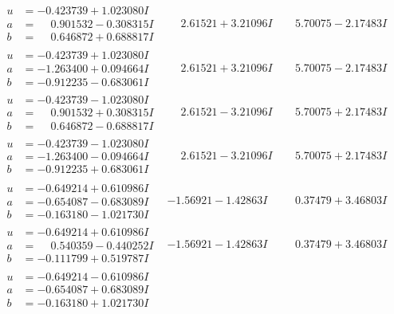 \documentclass[1p]{elsarticle_modified}
\theoremstyle{definition}
\begin{document}
$$\begin{array}{c|c|c}
\begin{aligned}
u &= -0.423739 + 1.023080 I \\
a &= \phantom{-}0.901532 - 0.308315 I \\
b &= \phantom{-}0.646872 + 0.688817 I\end{aligned}
 & \phantom{-}2.61521 + 3.21096 I & \phantom{-}5.70075 - 2.17483 I \\ \hline\begin{aligned}
u &= -0.423739 + 1.023080 I \\
a &= -1.263400 + 0.094664 I \\
b &= -0.912235 - 0.683061 I\end{aligned}
 & \phantom{-}2.61521 + 3.21096 I & \phantom{-}5.70075 - 2.17483 I \\ \hline\begin{aligned}
u &= -0.423739 - 1.023080 I \\
a &= \phantom{-}0.901532 + 0.308315 I \\
b &= \phantom{-}0.646872 - 0.688817 I\end{aligned}
 & \phantom{-}2.61521 - 3.21096 I & \phantom{-}5.70075 + 2.17483 I \\ \hline\begin{aligned}
u &= -0.423739 - 1.023080 I \\
a &= -1.263400 - 0.094664 I \\
b &= -0.912235 + 0.683061 I\end{aligned}
 & \phantom{-}2.61521 - 3.21096 I & \phantom{-}5.70075 + 2.17483 I \\ \hline\begin{aligned}
u &= -0.649214 + 0.610986 I \\
a &= -0.654087 - 0.683089 I \\
b &= -0.163180 - 1.021730 I\end{aligned}
 & -1.56921 - 1.42863 I & \phantom{-}0.37479 + 3.46803 I \\ \hline\begin{aligned}
u &= -0.649214 + 0.610986 I \\
a &= \phantom{-}0.540359 - 0.440252 I \\
b &= -0.111799 + 0.519787 I\end{aligned}
 & -1.56921 - 1.42863 I & \phantom{-}0.37479 + 3.46803 I \\ \hline\begin{aligned}
u &= -0.649214 - 0.610986 I \\
a &= -0.654087 + 0.683089 I \\
b &= -0.163180 + 1.021730 I\end{aligned}

\end{array}$$
\end{document}
